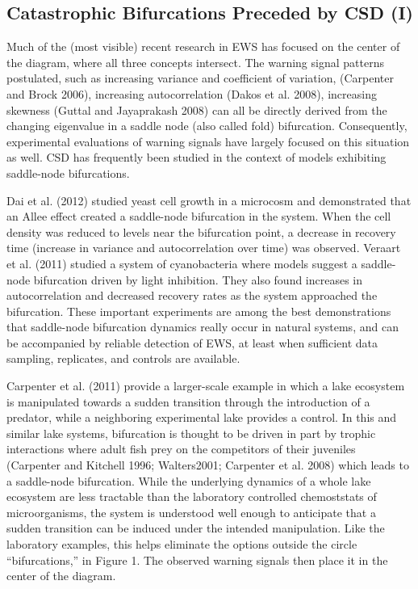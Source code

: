 \documentclass[author-year, review]{elsarticle} %
\begin{document}
\subsection{Catastrophic Bifurcations Preceded by CSD (I)}

Much of the (most visible) recent research in EWS has focused on the
center of the diagram, where all three concepts intersect. The warning
signal patterns postulated, such as increasing variance and coefficient
of variation, (Carpenter and Brock 2006), increasing autocorrelation
(Dakos et al. 2008), increasing skewness (Guttal and Jayaprakash 2008)
can all be directly derived from the changing eigenvalue in a saddle
node (also called fold) bifurcation. Consequently, experimental
evaluations of warning signals have largely focused on this situation as
well. CSD has frequently been studied in the context of models
exhibiting saddle-node bifurcations.

Dai et al. (2012) studied yeast cell growth in a microcosm and
demonstrated that an Allee effect created a saddle-node bifurcation in
the system. When the cell density was reduced to levels near the
bifurcation point, a decrease in recovery time (increase in variance and
autocorrelation over time) was observed. Veraart et al. (2011) studied a
system of cyanobacteria where models suggest a saddle-node bifurcation
driven by light inhibition. They also found increases in autocorrelation
and decreased recovery rates as the system approached the bifurcation.
These important experiments are among the best demonstrations that
saddle-node bifurcation dynamics really occur in natural systems, and
can be accompanied by reliable detection of EWS, at least when
sufficient data sampling, replicates, and controls are available.

Carpenter et al. (2011) provide a larger-scale example in which a lake
ecosystem is manipulated towards a sudden transition through the
introduction of a predator, while a neighboring experimental lake
provides a control. In this and similar lake systems, bifurcation is
thought to be driven in part by trophic interactions where adult fish
prey on the competitors of their juveniles (Carpenter and Kitchell 1996;
Walters2001; Carpenter et al. 2008) which leads to a saddle-node
bifurcation. While the underlying dynamics of a whole lake ecosystem are
less tractable than the laboratory controlled chemoststats of
microorganisms, the system is understood well enough to anticipate that
a sudden transition can be induced under the intended manipulation. Like
the laboratory examples, this helps eliminate the options outside the
circle ``bifurcations,'' in Figure 1. The observed warning signals then
place it in the center of the diagram.
\end{document}
